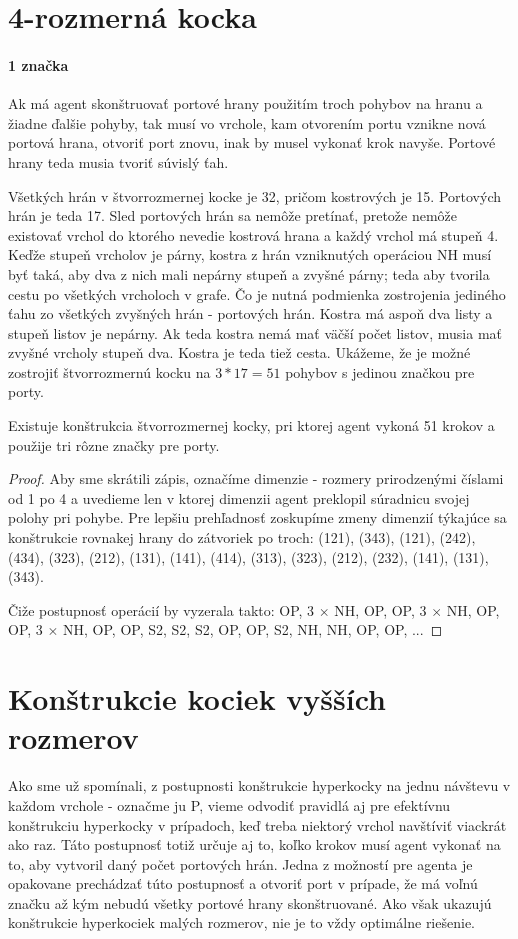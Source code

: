 \section{4-rozmerná kocka}
\paragraph{1 značka}
Ak má agent skonštruovať portové hrany použitím troch pohybov na hranu 
a žiadne
ďalšie pohyby, tak musí vo vrchole, kam otvorením portu vznikne nová
portová hrana, otvoriť port znovu, inak by musel vykonať krok navyše.
Portové hrany teda musia tvoriť súvislý ťah. 

Všetkých hrán v štvorrozmernej kocke je 32, pričom kostrových je 15.
Portových hrán je teda 17. Sled portových hrán sa nemôže pretínať, pretože
nemôže existovať vrchol do ktorého nevedie kostrová hrana a každý vrchol má
stupeň 4. Keďže stupeň vrcholov je párny, kostra z hrán vzniknutých
operáciou NH musí byť taká, aby
dva z nich mali nepárny stupeň a zvyšné párny; teda aby tvorila cestu po
všetkých vrcholoch v grafe. Čo je nutná podmienka zostrojenia
jediného ťahu zo všetkých zvyšných hrán - portových hrán. 
Kostra má aspoň dva listy a stupeň listov je nepárny. 
Ak teda kostra nemá mať väčší počet listov, musia mať
zvyšné vrcholy stupeň dva. Kostra je teda tiež cesta. Ukážeme, že je možné
zostrojiť štvorrozmernú kocku na $3 * 17 = 51$ pohybov s jedinou značkou pre
porty. 
\begin{veta}
Existuje konštrukcia štvorrozmernej kocky, pri ktorej agent vykoná 51 krokov
a použije tri rôzne značky pre porty.
\end{veta}
\begin{proof}
Aby sme skrátili zápis, označíme dimenzie - rozmery prirodzenými číslami od 1 po 4 a
uvedieme len v ktorej dimenzii agent preklopil súradnicu svojej polohy pri
pohybe. Pre lepšiu prehľadnosť zoskupíme zmeny dimenzií týkajúce sa konštrukcie
rovnakej hrany do zátvoriek po troch: (121), (343), (121), (242), (434),
(323), (212), (131), (141), (414), (313), (323), (212), (232), (141), (131),
(343).

Čiže postupnosť operácií by vyzerala takto: OP, 3 $\times$ NH, OP, OP, 3 $\times$
NH, OP, OP, 3 $\times$ NH, OP, OP, S2, S2, S2, OP, OP, S2, NH, NH, OP, OP,
...
\end{proof}

\section{Konštrukcie kociek vyšších rozmerov}
Ako sme už spomínali, z postupnosti konštrukcie hyperkocky na jednu návštevu
v každom vrchole - označme ju P, vieme odvodiť pravidlá aj pre efektívnu konštrukciu
hyperkocky v prípadoch, keď treba niektorý vrchol navštíviť viackrát ako
raz. Táto postupnosť totiž určuje aj to, koľko krokov musí agent vykonať na
to, aby vytvoril daný počet portových hrán. Jedna z možností pre agenta je
opakovane prechádzať túto postupnosť a otvoriť port v prípade, že má voľnú
značku až kým nebudú všetky portové hrany skonštruované. Ako však ukazujú
konštrukcie hyperkociek malých rozmerov, nie  je to vždy optimálne
riešenie.

